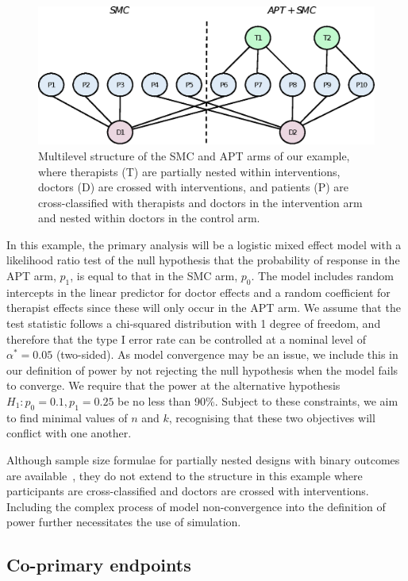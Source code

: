\documentclass[sagev]{sagej}
\begin{document}
\begin{figure}
\centering
\includegraphics[scale=0.7]{./figures/ex1_structure.eps}
\caption{Multilevel structure of the SMC and APT arms of our example, where therapists (T) are partially nested within interventions, doctors (D) are crossed with interventions, and patients (P) are cross-classified with therapists and doctors in the intervention arm and nested within doctors in the control arm.}
\label{fig:ex1_structure}
\end{figure}

In this example, the primary analysis will be a logistic mixed effect model with a likelihood ratio test of the null hypothesis that the probability of response in the APT arm, $p_1$, is equal to that in the SMC arm, $p_0$. The model includes random intercepts in the linear predictor for doctor effects and a random coefficient for therapist effects since these will only occur in the APT arm. We assume that the test statistic follows a chi-squared distribution with 1 degree of freedom, and therefore that the type I error rate can be controlled at a nominal level of $\alpha^* = 0.05$ (two-sided). As model convergence may be an issue, we include this in our definition of power by not rejecting the null hypothesis when the model fails to converge. We require that the power at the alternative hypothesis $H_1: p_0=0.1, p_1=0.25$ be no less than 90\%. Subject to these constraints, we aim to find minimal values of $n$ and $k$, recognising that these two objectives will conflict with one another. 

Although sample size formulae for partially nested designs with binary outcomes are available~\cite{Roberts2015}, they do not extend to the structure in this example where participants are cross-classified and doctors are crossed with interventions. Including the complex process of model non-convergence into the definition of power further necessitates the use of simulation.


\subsection{Co-primary endpoints}\label{sec:ex2}
\end{document}

